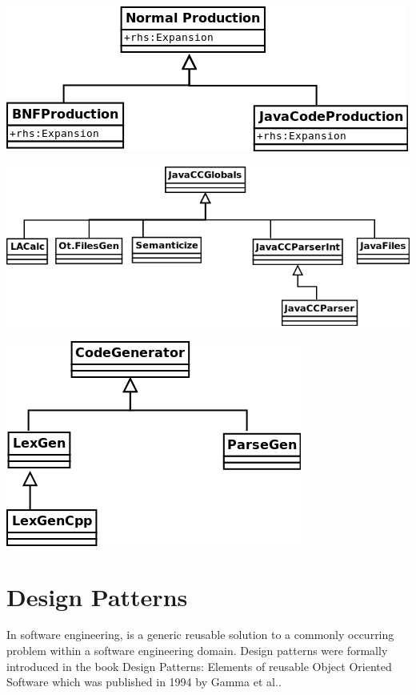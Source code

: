 \documentclass[oneside]{book}
\begin{document}
\begin{center}
\includegraphics[scale=0.5]{NormalProduction.png}
\end{center}

\begin{center}
\includegraphics[scale=0.5]{javaCCGlobals.png}
\end{center}

\begin{center}
\includegraphics[scale=0.5]{CodeGenerator.png}
\end{center}

\section{Design Patterns}
In software engineering, is a generic reusable solution to a commonly occurring problem within a software engineering domain. Design patterns were formally introduced in the book Design Patterns: Elements of reusable Object Oriented Software which was published in 1994 by Gamma et al.\cite{gamma1994}.
\end{document}
